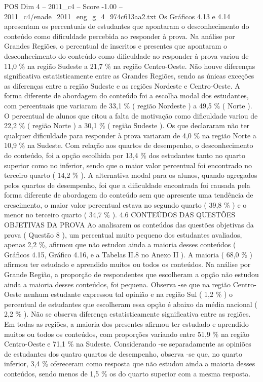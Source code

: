 \begin{textsample}{POS Dim 4 – 2011\_c4 – Score -1.00 – 2011\_c4/enade\_2011\_eng\_g\_4\_974c613aa2.txt}
Os Gráficos 4.13 e 4.14 apresentam os percentuais de estudantes que apontaram o desconhecimento do conteúdo como dificuldade percebida ao responder à prova.
Na análise por Grandes Regiões, o percentual de inscritos e presentes que apontaram o desconhecimento do conteúdo como dificuldade ao responder à prova variou de 11,0 \% na região Sudeste a 21,7 \% na região Centro-Oeste.
Não houve diferenças significativa estatisticamente entre as Grandes Regiões, sendo as únicas exceções as diferenças entre a região Sudeste e as regiões Nordeste e Centro-Oeste.
A forma diferente de abordagem do conteúdo foi a escolha modal dos estudantes, com percentuais que variaram de 33,1 \% ( região Nordeste ) a 49,5 \% ( Norte ).
O percentual de alunos que citou a falta de motivação como dificuldade variou de 22,2 \% ( região Norte ) a 30,1 \% ( região Sudeste ).
Os que declararam não ter qualquer dificuldade para responder à prova variaram de 4,0 \% na região Norte a 10,9 \% na Sudeste.
Com relação aos quartos de desempenho, o desconhecimento do conteúdo, foi a opção escolhida por 13,4 \% dos estudantes tanto no quarto superior como no inferior, sendo que o maior valor percentual foi encontrado no terceiro quarto ( 14,2 \% ).
A alternativa modal para os alunos, quando agregados pelos quartos de desempenho, foi que a dificuldade encontrada foi causada pela forma diferente de abordagem do conteúdo sem que apresente uma tendência de crescimento, o maior valor percentual estava no segundo quarto ( 39,8 \% ) e o menor no terceiro quarto ( 34,7 \% ). 4.6 CONTEÚDOS DAS QUESTÕES OBJETIVAS DA PROVA Ao analisarem os conteúdos das questões objetivas da prova ( Questão 8 ), um percentual muito pequeno dos estudantes avaliados, apenas 2,2 \%, afirmou que não estudou ainda a maioria desses conteúdos ( Gráficos 4.15, Gráfico 4.16, e a Tabelas II.8 no Anexo II ).
A maioria ( 68,0 \% ) afirmou ter estudado e aprendido muitos ou todos os conteúdos.
Na análise por Grande Região, a proporção de respondentes que escolheram a opção não estudou ainda a maioria desses conteúdos, foi pequena.
Observa -se que na região Centro-Oeste nenhum estudante expressou tal opinião e na região Sul ( 1,2 \% ) o percentual de estudantes que escolheram essa opção é abaixo da média nacional ( 2,2 \% ).
Não se observa diferença estatisticamente significativa entre as regiões.
Em todas as regiões, a maioria dos presentes afirmou ter estudado e aprendido muitos ou todos os conteúdos, com proporções variando entre 51,9 \% na região Centro-Oeste e 71,1 \% na Sudeste.
Considerando -se separadamente as opiniões de estudantes dos quatro quartos de desempenho, observa -se que, no quarto inferior, 3,4 \% ofereceram como resposta que não estudou ainda a maioria desses conteúdos, sendo menos de 1,5 \% os do quarto superior com a mesma resposta.

\end{textsample}
